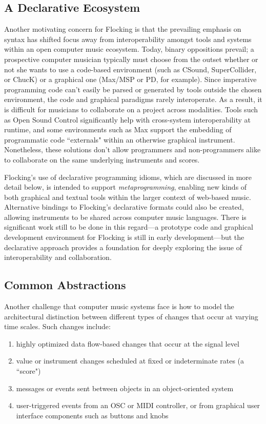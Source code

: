 \documentclass{article}
\begin{document}
\subsection{A Declarative Ecosystem}

Another motivating concern for Flocking is that the prevailing emphasis on syntax has shifted focus away from interoperability amongst tools and systems within an open computer music ecosystem. Today, binary oppositions prevail; a prospective computer musician typically must choose from the outset whether or not she wants to use a code-based environment (such as CSound, SuperCollider, or ChucK) or a graphical one (Max/MSP or PD, for example). Since imperative programming code can't easily be parsed or generated by tools outside the chosen environment, the code and graphical paradigms rarely interoperate. As a result, it is difficult for musicians to collaborate on a project across modalities. Tools such as Open Sound Control \cite{wright1997open} significantly help with cross-system interoperability at runtime, and some environments such as Max support the embedding of programmatic code ``externals" within an otherwise graphical instrument. Nonetheless, these solutions don't allow programmers and non-programmers alike to collaborate on the same underlying instruments and scores.

Flocking's use of declarative programming idioms, which are discussed in more detail below, is intended to support {\it metaprogramming}, enabling new kinds of both graphical and textual tools within the larger context of web-based music. Alternative bindings to Flocking's declarative formats could also be created, allowing instruments to be shared across computer music languages. There is significant work still to be done in this regard---a prototype code and graphical development environment for Flocking is still in early development---but the declarative approach provides a foundation for deeply exploring the issue of interoperability and collaboration.

\subsection{Common Abstractions}

Another challenge that computer music systems face is how to model the architectural distinction between different types of changes that occur at varying time scales. Such changes include:

\begin{enumerate}
\item highly optimized data flow-based changes that occur at the signal level
\item value or instrument changes scheduled at fixed or indeterminate rates (a ``score")
\item messages or events sent between objects in an object-oriented system
\item user-triggered events from an OSC or MIDI controller, or from graphical user interface components such as buttons and knobs
\end{enumerate}
\end{document}
